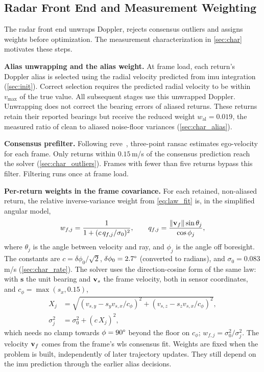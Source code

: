 \subsection{Radar Front End and Measurement Weighting}
\label{sec:robust}

The radar front end unwraps Doppler, rejects consensus outliers and
assigns weights before optimization.  The measurement characterization
in \autoref{sec:char} motivates these steps.

\textbf{Alias unwrapping and the alias weight.}
At frame load, each return's Doppler alias is selected using the
radial velocity predicted from \ac{imu} integration
(\autoref{sec:init}).  Correct selection requires the predicted radial
velocity to be within $v_{\max}$ of the true value.  All subsequent
stages use this unwrapped Doppler.
Unwrapping does not correct the bearing errors of aliased returns.
These returns retain their reported bearings but receive the reduced
weight $w_{\mathrm{al}}=0.019$, the measured ratio of clean to aliased
noise-floor variances (\autoref{sec:char_alias}).

\textbf{Consensus prefilter.}
Following \mbox{reve}~\cite{doer2020ekf}, three-point \ac{ransac}
estimates ego-velocity for each frame.  Only returns within
$0.15$\,m/s of the consensus prediction reach the solver
(\autoref{sec:char_outliers}).  Frames with fewer than five returns
bypass this filter.  Filtering runs once at frame load.

\textbf{Per-return weights in the frame covariance.}
For each retained, non-aliased return, the relative inverse-variance
weight from \eqref{eq:law_fit} is, in the simplified angular model,
\begin{equation}
  w_{f,j} = \frac{1}{1 + (c\,q_{f,j}/\sigma_0)^2}, \qquad
  q_{f,j} = \frac{\lVert\mathbf{v}_f\rVert\sin\theta_j}{\cos\phi_j},
  \label{eq:weight}
\end{equation}
where $\theta_j$ is the angle between velocity and ray, and $\phi_j$
is the angle off boresight.  The constants are
$c=\delta\phi_0/\sqrt2$, $\delta\phi_0=2.7\degree$ (converted to
radians), and $\sigma_0=0.083$\,m/s (\autoref{sec:char_rate}).
The solver uses the direction-cosine form of the same law: with
$\mathbf{s}$ the unit bearing and $\mathbf{v}_s$ the frame velocity, both in
sensor coordinates, and $c_\phi = \max(s_x, 0.15)$,
\begin{equation}
\begin{aligned}
  X_j &= \sqrt{(v_{s,y} - s_y v_{s,x}/c_\phi)^2 + (v_{s,z} - s_z v_{s,x}/c_\phi)^2},\\
  \sigma_j^2 &= \sigma_0^2 + (c\,X_j)^2,
\end{aligned}
\label{eq:dircos}
\end{equation}
which needs no clamp towards $\phi = 90\degree$ beyond the floor on
$c_\phi$; $w_{f,j} = \sigma_0^2/\sigma_j^2$.
The velocity $\mathbf{v}_f$ comes from the frame's \ac{wls} consensus fit.
Weights are fixed when the problem is built, independently of later
trajectory updates.  They still depend on the \ac{imu} prediction
through the earlier alias decisions.

